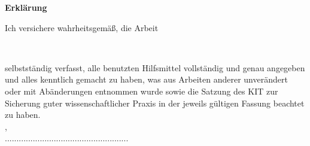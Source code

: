

\begin{center}
{\LARGE {\textbf{Erklärung}}}\\[2.5cm]
\end{center}
Ich versichere wahrheitsgemäß, die Arbeit
\vspace{1cm}
\begin{center}
\large {\titleofthesis}\\
\vspace{1cm}
\end{center}
selbstständig verfasst, alle benutzten Hilfsmittel vollständig und genau angegeben und alles kenntlich gemacht zu haben, was aus Arbeiten anderer unverändert oder mit Abänderungen entnommen wurde sowie die Satzung des KIT zur Sicherung guter wissenschaftlicher Praxis in der jeweils gültigen Fassung beachtet zu haben.\\[2.5cm]
{\city}, {\dateofthesis}\\[0.75cm]
\hspace*{9.0cm}.....................................................\\
\hspace*{11.1cm}\name


